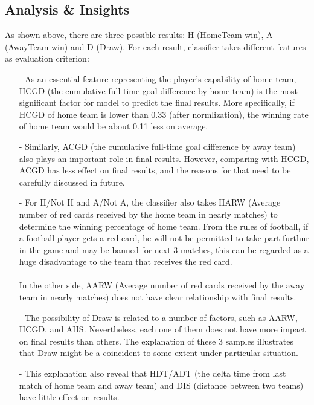 \documentclass{article}
\begin{document}
\subsection{Analysis \& Insights}
As shown above, there are three possible results: H (HomeTeam win), A (AwayTeam win) and D (Draw). For each result, classifier takes different features as  evaluation criterion:
\begin{itemize}
\item[-] As an essential feature representing the player's capability of home team, HCGD (the cumulative full-time goal difference by home team) is the most significant factor for model to predict the final results. More specifically, if HCGD of home team is lower than 0.33 (after normlization), the winning rate of home team would be about 0.11 less on average.\\
\item[-] Similarly, ACGD (the cumulative full-time goal difference by away team) also plays an important role in final results. However, comparing with HCGD, ACGD has less effect on final results, and the reasons for that need to be carefully discussed in future. 
\\
\item[-] For H/Not H and A/Not A, the classifier also takes HARW (Average number of red cards received by the home team in nearly matches) to determine the winning percentage of home team. From the rules of football, if a football player gets a red card, he will not be permitted to take part furthur in the game and may be banned for next 3 matches, this can be regarded as a huge disadvantage to the team that receives the red card.\\
~\\
In the other side, AARW (Average number of red cards received by the away team in nearly matches) does not have clear relationship with final results.
\\

\item[-] The possibility of Draw is related to a number of factors, such as AARW, HCGD, and AHS. Nevertheless, each one of them does not have more impact on final results than others. The explanation of these 3 samples illustrates that Draw might be a coincident to some extent under particular situation.
\\

\item[-] This explanation also reveal that HDT/ADT (the delta time from last match of home team and away team) and DIS (distance between two teams) have little effect on results. 
\\

\end{itemize}
\end{document}
